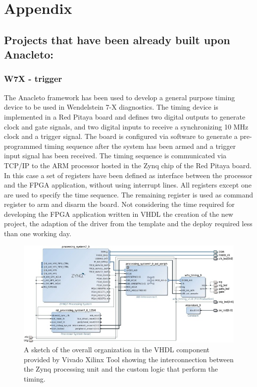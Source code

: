 \chapter{Appendix}
\section{Projects that have been already built upon Anacleto:}
\subsection{W7X - trigger }
\cite{RIGONI2018122}
The Anacleto framework has been used to develop a general purpose timing device to be used in Wendelstein 7-X diagnostics. The timing device is implemented in a Red Pitaya board and defines two digital outputs to generate clock and gate signals, and two digital inputs to receive a synchronizing 10 MHz clock and a trigger signal. The board is configured via software to generate a pre-programmed timing sequence after the system has been armed and a trigger input signal has been received. The timing sequence is communicated via TCP/IP to the ARM processor hosted in the Zynq chip of the Red Pitaya board. In this case a set of registers have been defined as interface between the processor and the FPGA application, without using interrupt lines. All registers except one are used to specify the time sequence. The remaining register is used as command register to arm and disarm the board. Not considering the time required for developing the FPGA application written in VHDL the creation of the new project, the adaption of the driver from the template and the deploy required less than one working day.

\begin{figure}
    \centering
    \includegraphics{img/APPENDIX/W7X_VHDL.jpg}
    \caption{A sketch of the overall organization in the VHDL component provided by Vivado Xilinx Tool showing the interconnection between the Zynq processing unit and the custom logic that perform the timing. }
    \label{fig:W7X}
\end{figure}


